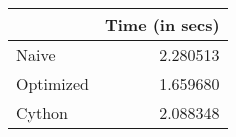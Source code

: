 \begin{tabular}{lr}
\toprule
{} &  Time (in secs) \\
\midrule
Naive     &        2.280513 \\
Optimized &        1.659680 \\
Cython    &        2.088348 \\
\bottomrule
\end{tabular}
